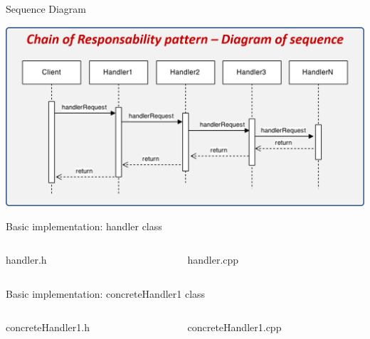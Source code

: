 \documentclass[13pt]{beamer}
\begin{document}
\begin{frame}{Sequence Diagram}
\begin{center}
	\includegraphics[scale=0.25]{./images/sequence.png}
\end{center}
\end{frame}

\begin{frame}{Basic implementation: handler class}
\begin{columns}[T]
\begin{column}{.45\textwidth}
\lstset{basicstyle=\tiny,style=myCustomCppStyle}
handler.h

\end{column}

\begin{column}{.45\textwidth}
\lstset{basicstyle=\tiny,style=myCustomCppStyle}
handler.cpp

\end{column}
\end{columns}
\end{frame}

\begin{frame}{Basic implementation: concreteHandler1 class}
\begin{columns}[T]
\begin{column}{.45\textwidth}
\lstset{basicstyle=\tiny,style=myCustomCppStyle}
concreteHandler1.h

\end{column}

\begin{column}{.45\textwidth}
\lstset{basicstyle=\tiny,style=myCustomCppStyle}
concreteHandler1.cpp

\end{column}
\end{columns}
\end{frame}
\end{document}
